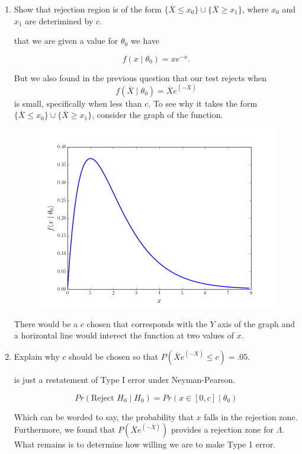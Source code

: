\documentclass{tufte-book}
\theoremstyle{mytheoremstyle}
\theoremstyle{mylemstyle}
\theoremstyle{mydefstyle}
\begin{document}
\begin{enumerate}

\item Show that rejection region is of the form $\{\overline{X} \leq x_0\} \cup \{ \overline{X} \geq x_1 \}$, where $x_0$ and $x_1$ are deterimined by $c$.

 that we are given a value for $\theta_0$ we have

\[ f(x\mid \theta_0) = xe^{-x}. \]

But we also found in the previous question that our test rejects when
\[ f(\overline{X} \mid \theta_0) = \overline{X} e^{(-\overline{X})} \]
is small, specifically when less than $c$.  To see why it takes the form
$\{\overline{X} \leq x_0\} \cup \{ \overline{X} \geq x_1 \}$, consider the graph of the function.

\begin{figure}
\includegraphics{q3}
\end{figure}

There would be a $c$ chosen that corresponds with the $Y$ axis of the graph and a horizontal line would interect the function at two values of $x$.

\item Explain why $c$ should be chosen so that $P(\overline{X} e^{(-\overline{X})} \leq c) = .05$.

 is just a restatement of Type I error under Neyman-Pearson.

\[Pr(\text{Reject }H_0 \mid H_0) = Pr(x \in [0, c] \mid \theta_0) \]

Which can be worded to say, the probability that $x$ falls in the rejection zone.  Furthermore, we found that $P(\overline{X} e^{(-\overline{X})})$ provides a rejection zone for $\Lambda$.  What remains is to determine how willing we are to make Type 1 error.


\end{enumerate}
\end{document}
